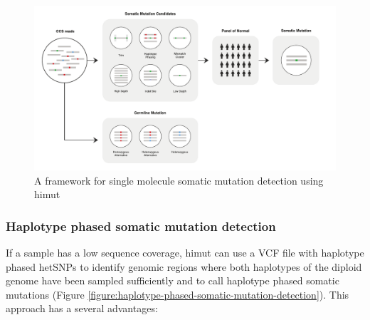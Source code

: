 \begin{figure}[htbp!]
\caption{A framework for single molecule somatic mutation detection using himut}
\label{figure:somatic-mutation-detection}
\begin{centering}
\includegraphics[width=\textwidth]{Vector/himut.pdf}
\end{centering}
\end{figure}

\pagebreak

\subsubsection{Haplotype phased somatic mutation detection}

If a sample has a low sequence coverage, himut can use a VCF file with haplotype phased hetSNPs to identify genomic regions where both haplotypes of the diploid genome have been sampled sufficiently and to call haplotype phased somatic mutations (Figure \ref{figure:haplotype-phased-somatic-mutation-detection}). This approach has a several advantages: 


